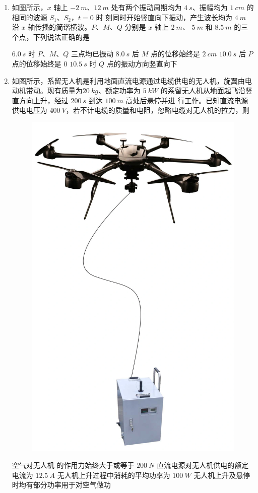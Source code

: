 \begin{enumerate}
\item
如图所示，$ x $ 轴上 $ -2 \ m $、$ 12 \ m $ 处有两个振动周期均为 $ 4 \ s $、振幅均为 $ 1 \ cm $ 的相同的波源 $ S_{1} $、$ S_{2} $，$ t=0 $ 时
刻同时开始竖直向下振动，产生波长均为 $ 4 \ m $ 沿 $ x $ 轴传播的简谐横波。$ P $、$ M $、$ Q $ 分别是 $ x $ 轴上 $ 2 \ m $、 $ 5 \ m $ 和
$ 8.5 \ m $ 的三个点，下列说法正确的是  
\begin{figure}[h!]
\centering

\end{figure}


\fourchoices
{$ 6.0 \ s $ 时 $ P $、$ M $、$ Q $ 三点均已振动}
{$ 8.0 \ s $ 后 $ M $ 点的位移始终是 $ 2 \ cm $}
{$ 10.0 \ s $ 后 $ P $ 点的位移始终是 $ 0 $}
{$ 10.5 \ s $ 时 $ Q $ 点的振动方向竖直向下}



\item
如图所示，系留无人机是利用地面直流电源通过电缆供电的无人机，旋翼由电动机带动。现有质量为$ 20 \ kg $、额定功率为 $ 5 \ kW $ 的系留无人机从地面起飞沿竖直方向上升，经过 $ 200 \ s $ 到达 $ 100 \ m $ 高处后悬停并进
行工作。已知直流电源供电电压为 $ 400 \ V $，若不计电缆的质量和电阻，忽略电缆对无人机的拉力，则  
\begin{figure}[h!]
\centering
\includegraphics[width=0.15\linewidth]{picture/screenshot049}
\end{figure}

\fourchoices
{空气对无人机 的作用力始终大于或等于 $ 200 \ N $}
{直流电源对无人机供电的额定电流为 $ 12.5 \ A $}
{无人机上升过程中消耗的平均功率为 $ 100 \ W $}
{无人机上升及悬停时均有部分功率用于对空气做功}







\end{enumerate}
